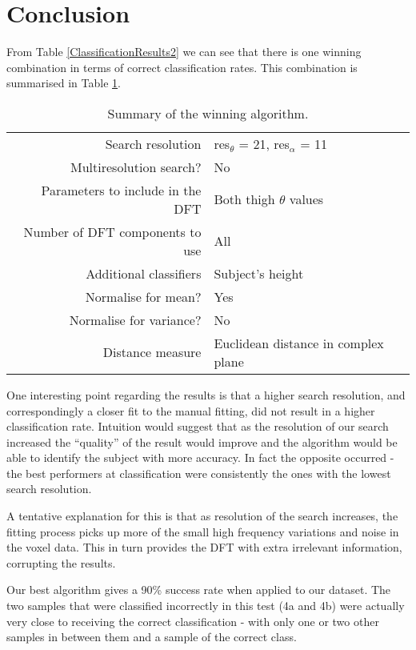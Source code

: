 \section{Conclusion}

From Table \ref{ClassificationResults2} we can see that there is one winning combination in terms of correct classification rates.
This combination is summarised in Table \ref{ConclusionTable}.

\begin{table}[hb]
	\centering
	\begin{tabular}{r|l}
		Search resolution & res$_\theta$ = 21, res$_\alpha$ = 11 \\
		Multiresolution search? & No \\
		Parameters to include in the DFT & Both thigh $\theta$ values\\
		Number of DFT components to use & All \\
		Additional classifiers & Subject's height \\
		Normalise for mean? & Yes \\
		Normalise for variance? & No \\
		Distance measure & Euclidean distance in complex plane
	\end{tabular}
	\caption{Summary of the winning algorithm.}
	\label{ConclusionTable}
\end{table}

One interesting point regarding the results is that a higher search resolution, and correspondingly a closer fit to the manual fitting, did not result in a higher classification rate.
Intuition would suggest that as the resolution of our search increased the ``quality'' of the result would improve and the algorithm would be able to identify the subject with more accuracy.
In fact the opposite occurred - the best performers at classification were consistently the ones with the lowest search resolution.

A tentative explanation for this is that as resolution of the search increases, the fitting process picks up more of the small high frequency variations and noise in the voxel data.
This in turn provides the DFT with extra irrelevant information, corrupting the results.

\bigskip
\noindent Our best algorithm gives a 90\% success rate when applied to our dataset.
The two samples that were classified incorrectly in this test (4a and 4b) were actually very close to receiving the correct classification - with only one or two other samples in between them and a sample of the correct class.

